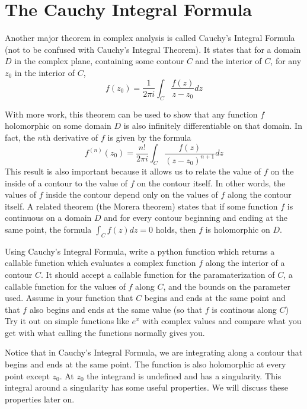 \section*{The Cauchy Integral Formula}

Another major theorem in complex analysis is called Cauchy's Integral Formula (not to be confused with Cauchy's Integral Theorem).
It states that for a domain $D$ in the complex plane, containing some contour $C$ and the interior of $C$, for any $z_0$ in the interior of $C$,
\[f(z_0)=\frac{1}{2\pi i} \int_C \frac{f(z)}{z-z_0} dz\]

With more work, this theorem can be used to show that any function $f$ holomorphic on some domain $D$ is also infinitely differentiable on that domain.
In fact, the $n$th derivative of $f$ is given by the formula
\[f^{(n)}(z_0) = \frac{n!}{2\pi i} \int_C \frac{f(z)}{(z-z_0)^{n+1}} dz\]
This result is also important because it allows us to relate the value of $f$ on the inside of a contour to the value of $f$ on the contour itself.
In other words, the values of $f$ inside the contour depend only on the values of $f$ along the contour itself.
A related theorem (the Morera theorem) states that if some function $f$ is continuous on a domain $D$ and for every contour beginning and ending at the same point, the formula $\int_C f(z) dz = 0$ holds, then $f$ is holomorphic on $D$.

\begin{problem}
Using Cauchy's Integral Formula, write a python function which returns a callable function which evaluates a complex function $f$ along the interior of a contour $C$.
It should accept a callable function for the paramaterization of $C$, a callable function for the values of $f$ along $C$, and the bounds on the parameter used.
Assume in your function that $C$ begins and ends at the same point and that $f$ also begins and ends at the same value (so that $f$ is continous along $C$)
Try it out on simple functions like $e^x$ with complex values and compare what you get with what calling the functions normally gives you.
\end{problem}

Notice that in Cauchy's Integral Formula, we are integrating along a contour that begins and ends at the same point.
The function is also holomorphic at every point except $z_0$. At $z_0$ the integrand is undefined and has a singularity.
This integral around a singularity has some useful properties.
We will discuss these properties later on.
